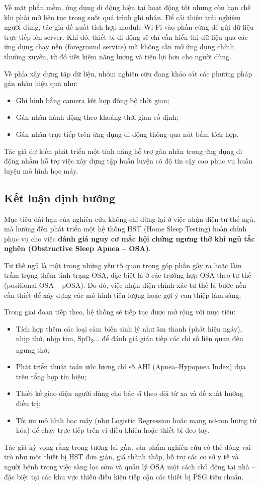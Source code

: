 Về mặt phần mềm, ứng dụng di động hiện tại hoạt động tốt nhưng còn hạn chế khi phải mở liên tục trong suốt quá trình ghi nhận. Để cải thiện trải nghiệm người dùng, tác giả đề xuất tích hợp module Wi-Fi vào phần cứng để gửi dữ liệu trực tiếp lên server. Khi đó, thiết bị di động sẽ chỉ cần hiển thị dữ liệu qua các ứng dụng chạy nền (foreground service) mà không cần mở ứng dụng chính thường xuyên, từ đó tiết kiệm năng lượng và tiện lợi hơn cho người dùng.

Về phía xây dựng tập dữ liệu, nhóm nghiên cứu đang khảo sát các phương pháp gán nhãn hiệu quả như:
\begin{itemize}
    \item Ghi hình bằng camera kết hợp đồng bộ thời gian;
    \item Gán nhãn hành động theo khoảng thời gian cố định;
    \item Gán nhãn trực tiếp trên ứng dụng di động thông qua nút bấm tích hợp.
\end{itemize}

Tác giả dự kiến phát triển một tính năng hỗ trợ gán nhãn trong ứng dụng di động nhằm hỗ trợ việc xây dựng tập huấn luyện có độ tin cậy cao phục vụ huấn luyện mô hình học máy.

\subsection*{Kết luận định hướng}

Mục tiêu dài hạn của nghiên cứu không chỉ dừng lại ở việc nhận diện tư thế ngủ, mà hướng đến phát triển một hệ thống HST (Home Sleep Testing) hoàn chỉnh phục vụ cho việc \textbf{đánh giá nguy cơ mắc hội chứng ngưng thở khi ngủ tắc nghẽn (Obstructive Sleep Apnea – OSA)}.

Tư thế ngủ là một trong những yếu tố quan trọng góp phần gây ra hoặc làm trầm trọng thêm tình trạng OSA, đặc biệt là ở các trường hợp OSA theo tư thế (positional OSA – pOSA). Do đó, việc nhận diện chính xác tư thế là bước nền cần thiết để xây dựng các mô hình tiên lượng hoặc gợi ý can thiệp lâm sàng.

Trong giai đoạn tiếp theo, hệ thống sẽ tiếp tục được mở rộng với mục tiêu:
\begin{itemize}
    \item Tích hợp thêm các loại cảm biến sinh lý như âm thanh (phát hiện ngáy), nhịp thở, nhịp tim, SpO\textsubscript{2}... để đánh giá gián tiếp các chỉ số liên quan đến ngưng thở;
    \item Phát triển thuật toán ước lượng chỉ số AHI (Apnea–Hypopnea Index) dựa trên tổng hợp tín hiệu;
    \item Thiết kế giao diện người dùng cho bác sĩ theo dõi từ xa và đề xuất hướng điều trị;
    \item Tối ưu mô hình học máy (như Logistic Regression hoặc mạng nơ-ron lượng tử hóa) để chạy trực tiếp trên vi điều khiển hoặc thiết bị đeo tay.
\end{itemize}

Tác giả kỳ vọng rằng trong tương lai gần, sản phẩm nghiên cứu có thể đóng vai trò như một thiết bị HST đơn giản, giá thành thấp, hỗ trợ các cơ sở y tế và người bệnh trong việc sàng lọc sớm và quản lý OSA một cách chủ động tại nhà – đặc biệt tại các khu vực thiếu điều kiện tiếp cận các thiết bị PSG tiêu chuẩn.
